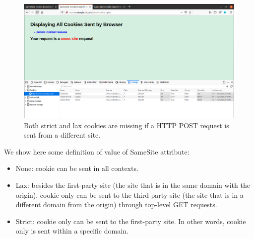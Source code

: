 \begin{figure}
    \centering
    \includegraphics[height=\textheight,width=\textwidth,keepaspectratio]
    {figures/samesite_cookie_post_crosssite.png}
    \caption{Both strict and lax cookies are missing if a HTTP POST request
    is sent from a different site.}
    \label{fig:crosssite_cookie_post}
\end{figure}

We show here some definition of value of {\selectfont SameSite}
attribute:

\begin{itemize}
    \item None: cookie can be sent in all contexts.
    \item Lax: besides the first-party site (the site that is in the same domain
    with the origin), cookie only can be sent to the third-party site (the site that
    is in a different domain from the origin) through top-level GET requests.
    \item Strict: cookie only can be sent to the first-party site. In other words,
    cookie only is sent within a specific domain.
\end{itemize}

